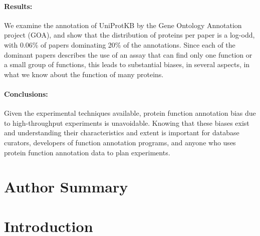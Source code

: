 \documentclass[12pt]{article}
\begin{document}
        \paragraph*{Results:} We examine the annotation of
UniProtKB by the Gene Ontology Annotation project (GOA), and show that
the distribution of proteins per paper is a log-odd, with 0.06\% of papers
dominating 20\% of the annotations. Since each of the dominant papers
describes the use of an assay that can find only one function or a small
group of functions, this leads to substantial biases, in several aspects, in what we know
about the function of many proteins.

        \paragraph*{Conclusions:} Given the experimental techniques
available, protein function annotation bias due to high-throughput experiments is unavoidable. Knowing
that these biases exist and understanding their characteristics and extent is important for
database curators, developers of function annotation programs, and
anyone who uses protein function annotation data to plan experiments.

\section*{Author Summary}

\section*{Introduction}
\end{document}
